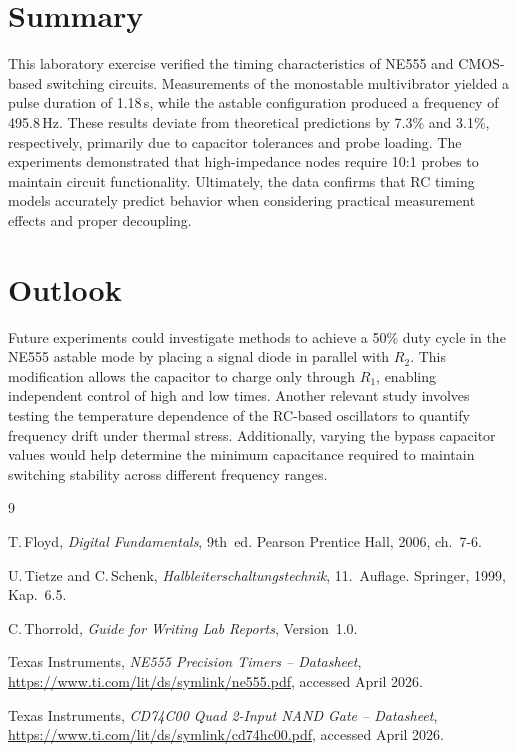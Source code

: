 \documentclass[12pt, a4paper]{article}
\begin{document}
\section{Summary}

This laboratory exercise verified the timing characteristics of NE555 and CMOS-based switching circuits. 
Measurements of the monostable multivibrator yielded a pulse duration of 1.18\,s, while the astable configuration produced a frequency of 495.8\,Hz. 
These results deviate from theoretical predictions by 7.3\% and 3.1\%, respectively, primarily due to capacitor tolerances and probe loading. 
The experiments demonstrated that high-impedance nodes require 10:1 probes to maintain circuit functionality. 
Ultimately, the data confirms that RC timing models accurately predict behavior when considering practical measurement effects and proper decoupling.

\section{Outlook}

Future experiments could investigate methods to achieve a 50\% duty cycle in the NE555 astable mode by placing a signal diode in parallel with $R_2$. 
This modification allows the capacitor to charge only through $R_1$, enabling independent control of high and low times. 
Another relevant study involves testing the temperature dependence of the RC-based oscillators to quantify frequency drift under thermal stress. 
Additionally, varying the bypass capacitor values would help determine the minimum capacitance required to maintain switching stability across different frequency ranges.

\begin{thebibliography}{9}

T.\,Floyd,
\textit{Digital Fundamentals}, 9th~ed.
Pearson Prentice Hall, 2006, ch.~7-6.

U.\,Tietze and C.\,Schenk,
\textit{Halbleiterschaltungstechnik}, 11.~Auflage.
Springer, 1999, Kap.~6.5.

C.\,Thorrold,
\textit{Guide for Writing Lab Reports}, Version~1.0.

Texas Instruments,
\textit{NE555 Precision Timers -- Datasheet},
\url{https://www.ti.com/lit/ds/symlink/ne555.pdf}, accessed April 2026.

Texas Instruments,
\textit{CD74C00 Quad 2-Input NAND Gate -- Datasheet},
\url{https://www.ti.com/lit/ds/symlink/cd74hc00.pdf}, accessed April 2026.

\end{thebibliography}
\end{document}
